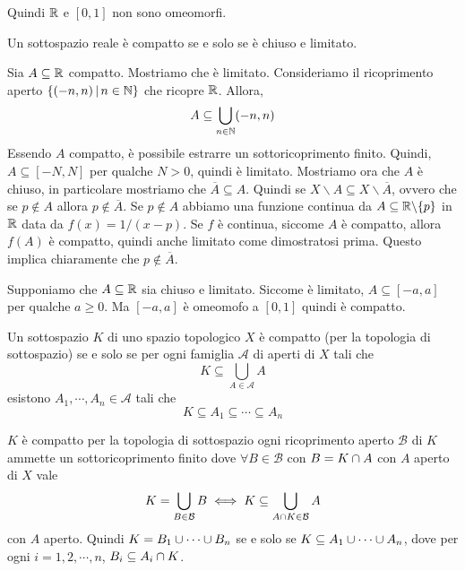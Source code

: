 \documentclass[a4paper]{article}
\begin{document}
Quindi \(\mathbb{R}\) e \([0,1]\) non sono omeomorfi.

\begin{snippetcorollary}{}
    Un sottospazio reale è compatto se e solo se
    è chiuso e limitato.
\end{snippetcorollary}

\begin{snippetproof}{}
    \begin{iffproof}
        \item Sia \(A \subseteq \mathbb{R}\) compatto.
        Mostriamo che è limitato.
        Consideriamo il ricoprimento aperto \(\{(-n, n) \,|\, n \in \mathbb{N}\}\)
        che ricopre \(\mathbb{R}\).
        Allora,
        \[
            A \subseteq \bigcup_{n \in \mathbb{N}} (-n, n)
        \]
        Essendo \(A\) compatto, è possibile estrarre un sottoricoprimento finito.
        Quindi, \(A \subseteq [-N, N]\) per qualche \(N > 0\), quindi è limitato.
        Mostriamo ora che \(A\) è chiuso, in particolare mostriamo che \(\overline{A} \subseteq A\).
        Quindi se \(X \backslash A \subseteq X \backslash \overline{A}\),
        ovvero che se \(p \notin A\) allora \(p \notin \overline{A}\).
        Se \(p \notin A\) abbiamo una funzione continua
        da \(A \subseteq \mathbb{R} \backslash \{p\}\) in \(\mathbb{R}\)
        data da \(f(x) = 1 / (x - p)\).
        Se \(f\) è continua, siccome \(A\) è compatto, allora \(f(A)\) è compatto,
        quindi anche limitato come dimostratosi prima.
        Questo implica chiaramente che \(p \notin \overline A\).
        \item Supponiamo che \(A \subseteq \mathbb{R}\) sia chiuso e limitato.
        Siccome è limitato, \(A \subseteq [-a, a]\) per qualche \(a \geq 0\).
        Ma \([-a, a]\) è omeomofo a \([0,1]\) quindi è compatto.
    \end{iffproof}
\end{snippetproof}

\begin{snippetproposition}{}
    Un sottospazio \(K\) di uno spazio topologico \(X\)
    è compatto (per la topologia di sottospazio)
    se e solo se per ogni famiglia \(\mathcal{A}\) di aperti di \(X\) tali che
    \[
        K \subseteq \bigcup_{A \in \mathcal{A}} A
    \]
    esistono \(A_1, \cdots, A_n \in \mathcal{A}\)
    tali che
    \[
        K \subseteq A_1 \subseteq \cdots \subseteq A_n
    \]
\end{snippetproposition}

\begin{snippetproof}{}
    \(K\) è compatto per la topologia di sottospazio
    ogni ricoprimento aperto \(\mathcal{B}\)
    di \(K\) ammette un sottoricoprimento finito dove
    \(\forall B \in \mathcal{B}\) con \(B = K \cap A\) con \(A\) aperto di \(X\) vale
    \[
        K = \bigcup_{B\in\mathcal{B}} B \iff K \subseteq \bigcup_{A \cap K \in \mathcal{B}} A
    \]
    con \(A\) aperto.
    Quindi \(K = B_1 \cup \cdots \cup B_n\)
    se e solo se \(K \subseteq A_1 \cup \cdots \cup A_n\),
    dove per ogni \(i=1,2,\cdots, n\), \(B_i \subseteq A_i \cap K\).
\end{snippetproof}
\end{document}

